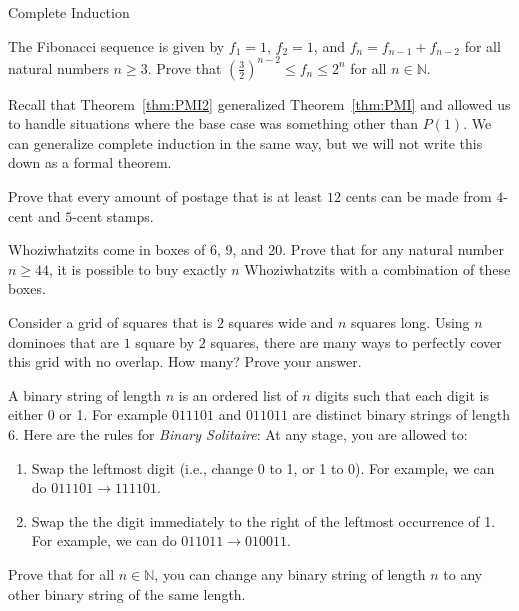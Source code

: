 \begin{section}{Complete Induction}

\begin{problem}\label{prob:Fibonacci}
The Fibonacci sequence is given by $f_1=1$, $f_2=1$, and $f_n=f_{n-1}+f_{n-2}$ for all natural numbers $n \geq 3$.  Prove that $\left(\frac{3}{2}\right)^{n-2}\leq f_n\leq 2^n$ for all $n\in\mathbb{N}$.
\end{problem}

Recall that Theorem~\ref{thm:PMI2} generalized Theorem~\ref{thm:PMI} and allowed us to handle situations where the base case was something other than $P(1)$.  We can generalize complete induction in the same way, but we will not write this down as a formal theorem.

\begin{problem}
Prove that every amount of postage that is at least $12$ cents can be made from $4$-cent and $5$-cent stamps.
\end{problem}


\begin{problem}
Whoziwhatzits come in boxes of 6, 9, and 20. Prove that for any natural number $n \geq 44$, it is possible to buy exactly $n$ Whoziwhatzits with a combination of these boxes.
\end{problem}

\begin{problem}
Consider a grid of squares that is $2$ squares wide and $n$ squares long.  Using $n$ dominoes that are $1$ square by $2$ squares, there are many ways to perfectly cover this grid with no overlap.  How many?  Prove your answer.
\end{problem}

\begin{problem}
A binary string of length $n$ is an ordered list of $n$ digits such that each digit is either 0 or 1. For example $011101$ and $011011$ are distinct binary strings of length 6. Here are the rules for \emph{Binary Solitaire}: At any stage, you are allowed to:
\begin{enumerate}[label=\textrm{(\roman*)}]
\item Swap the leftmost digit (i.e., change 0 to 1, or 1 to 0). For example, we can do $011101\to 111101$.
\item Swap the the digit immediately to the right of the leftmost occurrence of 1. For example, we can do $011011\to 010011$.
\end{enumerate}
Prove that for all $n\in\mathbb{N}$, you can change any binary string of length $n$ to any other binary string of the same length.
\end{problem}


\end{section}
